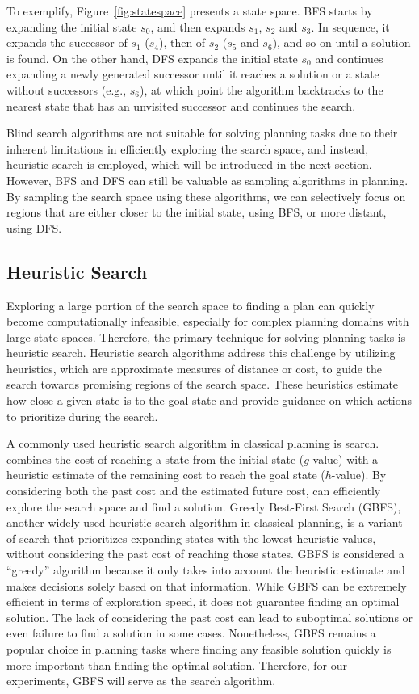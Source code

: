 To exemplify, Figure~\ref{fig:statespace} presents a state space. BFS starts by expanding the initial state $s_0$, and then expands $s_1$, $s_2$ and $s_3$. In sequence, it expands the successor of $s_1$ ($s_4$), then of $s_2$ ($s_5$ and $s_6$), and so on until a solution is found. On the other hand, DFS expands the initial state $s_0$ and continues expanding a newly generated successor until it reaches a solution or a state without successors (e.g., $s_6$), at which point the algorithm backtracks to the nearest state that has an unvisited successor and continues the search.

Blind search algorithms are not suitable for solving planning tasks due to their inherent limitations in efficiently exploring the search space, and instead, heuristic search is employed, which will be introduced in the next section. However, BFS and DFS can still be valuable as sampling algorithms in planning. By sampling the search space using these algorithms, we can selectively focus on regions that are either closer to the initial state, using BFS, or more distant, using DFS.

\subsection{Heuristic Search}
\label{sec:background_heuristicsearch}

Exploring a large portion of the search space to finding a plan can quickly become computationally infeasible, especially for complex planning domains with large state spaces. Therefore, the primary technique for solving planning tasks is heuristic search. Heuristic search algorithms address this challenge by utilizing heuristics, which are approximate measures of distance or cost, to guide the search towards promising regions of the search space. These heuristics estimate how close a given state is to the goal state and provide guidance on which actions to prioritize during the search.

A commonly used heuristic search algorithm in classical planning is \astar search. \astar combines the cost of reaching a state from the initial state ($g$-value) with a heuristic estimate of the remaining cost to reach the goal state ($h$-value). By considering both the past cost and the estimated future cost, \astar can efficiently explore the search space and find a solution. Greedy Best-First Search (GBFS), another widely used heuristic search algorithm in classical planning, is a variant of \astar search that prioritizes expanding states with the lowest heuristic values, without considering the past cost of reaching those states. GBFS is considered a ``greedy'' algorithm because it only takes into account the heuristic estimate and makes decisions solely based on that information. While GBFS can be extremely efficient in terms of exploration speed, it does not guarantee finding an optimal solution. The lack of considering the past cost can lead to suboptimal solutions or even failure to find a solution in some cases. Nonetheless, GBFS remains a popular choice in planning tasks where finding any feasible solution quickly is more important than finding the optimal solution. Therefore, for our experiments, GBFS will serve as the search algorithm.

